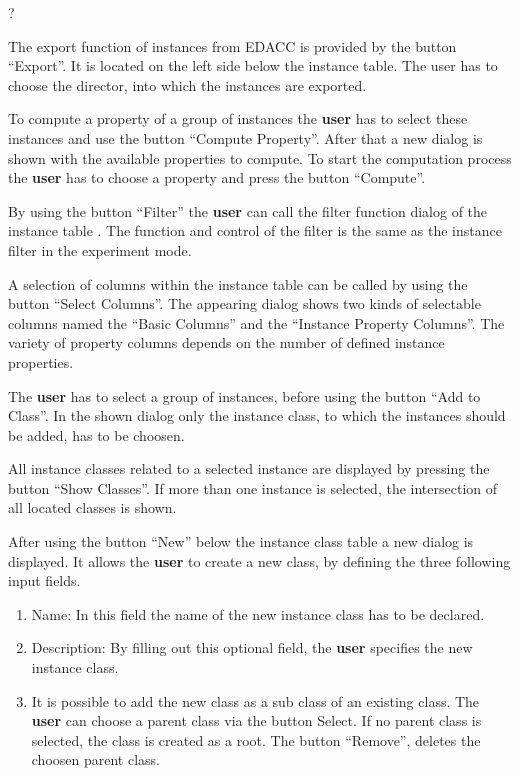  ?

 The export function of instances from EDACC is provided by the button ``Export''. It is located on the left side below the instance table. The user has to choose the director, into which the instances are exported.

 To compute a property of a group of instances the \textbf{user} has to select these instances and use the button ``Compute Property''. After that a new dialog is shown with the available properties to compute. To start the computation process  the \textbf{user} has to choose a property and press the button ``Compute''.

 By using the button ``Filter'' the \textbf{user} can call the filter function dialog of the instance table . The function and control of the filter is the same as the instance filter in the experiment mode.

 A selection of columns within the instance table can be called by using the button ``Select Columns''. The appearing dialog shows two kinds of selectable columns named the ``Basic Columns'' and the ``Instance Property Columns''. The variety of property columns depends on the number of defined instance properties.  

 The \textbf{user} has to select a group of instances, before using the button ``Add to Class''. In the shown dialog only the instance class, to which the instances should be added, has to be choosen.

 All instance classes related to a selected instance are displayed by pressing the button ``Show Classes''. If more than one instance is selected, the intersection of all located classes is shown.

\label{createInstanceClass} After using the button ``New'' below the instance class table a new dialog is displayed. It allows the \textbf{user} to create a new class, by defining the three following input fields.
\begin{enumerate}
	\item Name: In this field the name of the new instance class has to be declared.
	\item Description: By filling out this optional field, the \textbf{user} specifies the new instance class.
	\item It is possible to  add the new class as a sub class of an existing class. The \textbf{user} can choose a parent class via the button Select. If no parent class is selected, the class is created as a root. The button ``Remove'', deletes the choosen parent class.
\end{enumerate}

